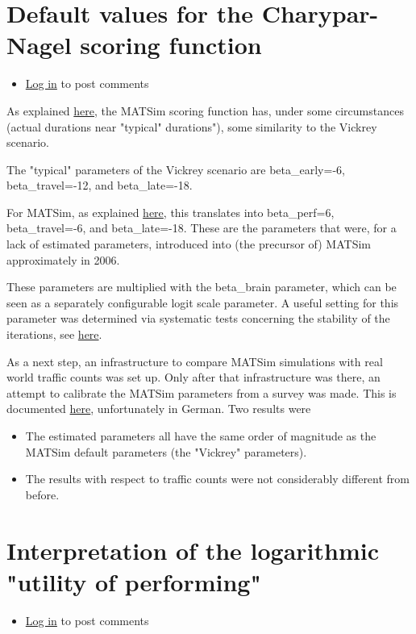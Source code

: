 \documentclass[a4paper,11pt]{report}
\begin{document}
\vfill\eject
\section{Default values for the Charypar-Nagel scoring function}
\begin{itemize}
	\item \href{http://www.matsim.org/user/login?destination=comment/reply/708%23comment-form}{Log in} to post comments
\end{itemize}

As explained \href{http://matsim.org/node/650}{here},  the MATSim scoring function has, under some circumstances (actual  durations near "typical" durations"), some similarity to the Vickrey  scenario.

The "typical" parameters of the Vickrey scenario are beta\_early=-6, beta\_travel=-12, and beta\_late=-18.

For MATSim, as explained \href{http://matsim.org/node/650}{here},  this translates into beta\_perf=6, beta\_travel=-6, and  beta\_late=-18. These are the parameters that were, for a lack of  estimated parameters, introduced into (the precursor of) MATSim  approximately in 2006.

These parameters are multiplied with the beta\_brain parameter, which  can be seen as a separately configurable logit scale parameter. A  useful setting for this parameter was determined via systematic tests  concerning the stability of the iterations, see \href{https://svn.vsp.tu-berlin.de/repos/public-svn/publications/vspwp/2004/04-03/}{here}.

As a next step, an infrastructure to compare MATSim simulations with  real world traffic counts was set up. Only after that  infrastructure was there, an attempt to calibrate the MATSim parameters  from a survey was made. This is documented \href{https://svn.vsp.tu-berlin.de/repos/public-svn/publications/vspwp/2009/09-10/}{here}, unfortunately in German. Two results were
\begin{itemize}
	\item The estimated parameters all have the same order of magnitude as the MATSim default parameters (the "Vickrey" parameters).
	\item The results with respect to traffic counts were not considerably different from before.
\end{itemize}



\vfill\eject
\section{Interpretation of the logarithmic "utility of performing"}
\begin{itemize}
	\item \href{http://www.matsim.org/user/login?destination=comment/reply/651%23comment-form}{Log in} to post comments
\end{itemize}
\end{document}
